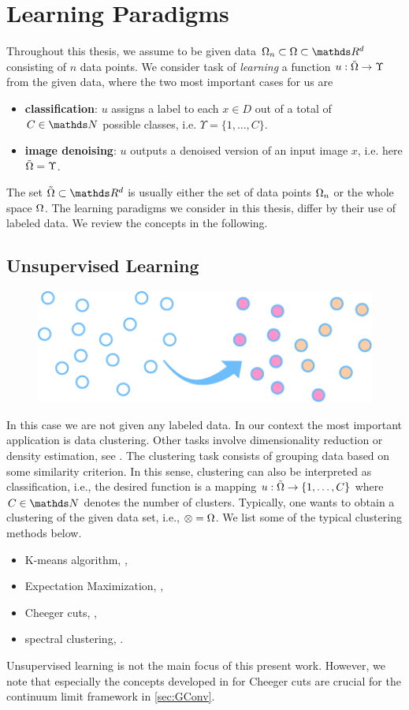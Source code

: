 \chapter{Learning Paradigms}\label{ch:para}

Throughout this thesis, we assume to be given data $\domain_n\subset\domain\subset \R^d$ consisting of $n$ data points. We consider task of \emph{learning} a function $u:\tilde{\Omega}\to \Upsilon$ from the given data, where the two most important cases for us are
%
\begin{itemize}
\item \textbf{classification}: $u$ assigns a label to each $x\in D$ out of a total of $C\in\N$ possible classes, i.e. $\Upsilon=\{1,\ldots,C\}$.
%
\item \textbf{image denoising}: $u$ outputs a denoised version of an input image $x$, i.e. here $\tilde{\Omega} = \Upsilon$.
\end{itemize}
%
The set $\tilde{\domain}\subset\R^d$ is usually either the set of data points $\Omega_n$ or the whole space $\Omega$. The learning paradigms we consider in this thesis, differ by their use of labeled data. We review the concepts in the following.
%
\section{Unsupervised Learning}
\begin{figure}
\centering
\includegraphics[width=.5\textwidth]{atelier/paradigms/UL.pdf}
\end{figure}

In this case we are not given any labeled data. In our context the most important application is data clustering. Other tasks involve dimensionality reduction or density estimation, see \cite{subramanya2014graph}. The clustering task consists of grouping data based on some similarity criterion. In this sense, clustering can also be interpreted as classification, i.e., the desired function is a mapping $u:\tilde{\Omega}\to \{1,\ldots, C\}$ where $C\in\N$ denotes the number of clusters. Typically, one wants to obtain a clustering of the given data set, i.e., $\mathcal{\Omega} = \Omega$. We list some of the typical clustering methods below.
%
\begin{itemize}
\item K-means algorithm, \cite{steinhaus1956division},
\item Expectation Maximization, \cite{dempster1977maximum},
\item Cheeger cuts, \cite{GarcSlep15, szlam2009total, trillos2016consistency, garcia2022graph},
\item spectral clustering, \cite{trillos2018variational}.
\end{itemize}
%
%
Unsupervised learning is not the main focus of this present work. However, we note that especially the concepts developed in \cite{GarcSlep15} for Cheeger cuts are crucial for the continuum limit framework in \cref{sec:GConv}.

